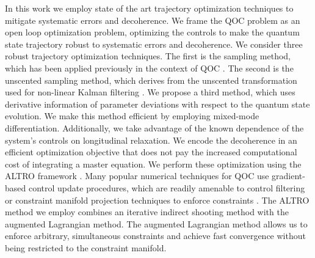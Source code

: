 \documentclass[
  amsfonts,
  amsmath,
  tbtags,
  amssymb,
  aps,
  nobibnotes,
  twocolumn,
  superscriptaddress,
]{revtex4-2}
\begin{document}
In this work we employ state of the art trajectory optimization techniques
to mitigate systematic errors and decoherence. We frame the QOC problem as an
open loop optimization problem, optimizing the controls to make the
quantum state trajectory robust to systematic errors and decoherence.
We consider three robust trajectory optimization techniques.
The first is the sampling method, which has been applied
previously in the context of QOC
\cite{carvalho2020error, reinhold2019controlling, rembold2020introduction}.
The second is the unscented sampling
method, which derives from the unscented transformation used
for non-linear Kalman filtering
\cite{julier2004unscented, lee2013sigma, manchester2016derivative}.
We propose a third method, which uses derivative information
of parameter deviations with respect to the quantum state evolution.
We make this method efficient by employing mixed-mode differentiation.
Additionally, we take advantage of the known dependence of the
system's controls on longitudinal relaxation. We encode
the decoherence in an efficient optimization objective that does
not pay the increased computational cost of integrating a master equation.
We perform these optimization using the ALTRO framework \cite{howell2019altro}.
Many popular numerical techniques
for QOC use gradient-based control update procedures, which are readily amenable to control filtering
or constraint manifold projection techniques to enforce constraints \cite{leung2017speedup,
  goer2019krotov, abdelhafez2019gradient, machnes2015gradient}.
The ALTRO method we employ combines
an iterative indirect shooting method with the augmented Lagrangian
method. The augmented Lagrangian method
allows us to enforce arbitrary, simultaneous constraints and achieve
fast convergence without being restricted to the constraint
manifold.
\end{document}
